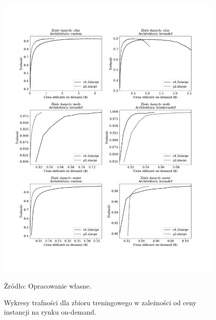 \documentclass[12pt,a4paper,twoside]{article}
\newcommand{\source}[1]{\caption*{\hfill Źródło: {#1}} }
\begin{document}
\begin{figure}[h]
  \centering
\includegraphics[scale=0.5]{../obrazy/fig:experiment_acc_price_ond.png}
\caption{Wykresy trafności dla zbioru treningowego w zależności od ceny instancji na rynku on-demand.\label{fig:experiment_acc_price_ond}}
\source{Opracowanie własne.}
\end{figure}
\end{document}
